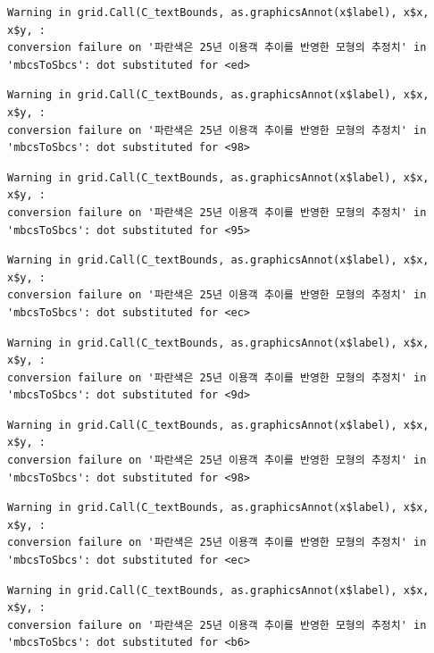 \documentclass[
  letterpaper,
  DIV=11,
  numbers=noendperiod]{scrreprt}
\begin{document}
\begin{verbatim}
Warning in grid.Call(C_textBounds, as.graphicsAnnot(x$label), x$x, x$y, :
conversion failure on '파란색은 25년 이용객 추이를 반영한 모형의 추정치' in
'mbcsToSbcs': dot substituted for <ed>
\end{verbatim}

\begin{verbatim}
Warning in grid.Call(C_textBounds, as.graphicsAnnot(x$label), x$x, x$y, :
conversion failure on '파란색은 25년 이용객 추이를 반영한 모형의 추정치' in
'mbcsToSbcs': dot substituted for <98>
\end{verbatim}

\begin{verbatim}
Warning in grid.Call(C_textBounds, as.graphicsAnnot(x$label), x$x, x$y, :
conversion failure on '파란색은 25년 이용객 추이를 반영한 모형의 추정치' in
'mbcsToSbcs': dot substituted for <95>
\end{verbatim}

\begin{verbatim}
Warning in grid.Call(C_textBounds, as.graphicsAnnot(x$label), x$x, x$y, :
conversion failure on '파란색은 25년 이용객 추이를 반영한 모형의 추정치' in
'mbcsToSbcs': dot substituted for <ec>
\end{verbatim}

\begin{verbatim}
Warning in grid.Call(C_textBounds, as.graphicsAnnot(x$label), x$x, x$y, :
conversion failure on '파란색은 25년 이용객 추이를 반영한 모형의 추정치' in
'mbcsToSbcs': dot substituted for <9d>
\end{verbatim}

\begin{verbatim}
Warning in grid.Call(C_textBounds, as.graphicsAnnot(x$label), x$x, x$y, :
conversion failure on '파란색은 25년 이용객 추이를 반영한 모형의 추정치' in
'mbcsToSbcs': dot substituted for <98>
\end{verbatim}

\begin{verbatim}
Warning in grid.Call(C_textBounds, as.graphicsAnnot(x$label), x$x, x$y, :
conversion failure on '파란색은 25년 이용객 추이를 반영한 모형의 추정치' in
'mbcsToSbcs': dot substituted for <ec>
\end{verbatim}

\begin{verbatim}
Warning in grid.Call(C_textBounds, as.graphicsAnnot(x$label), x$x, x$y, :
conversion failure on '파란색은 25년 이용객 추이를 반영한 모형의 추정치' in
'mbcsToSbcs': dot substituted for <b6>
\end{verbatim}
\end{document}
